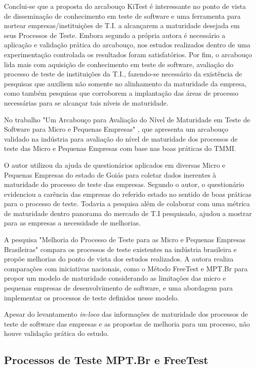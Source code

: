 Conclui-se que a proposta do arcabouço KiTest é interessante no ponto de vista de disseminação de conhecimento em teste de software e uma ferramenta para nortear empresas/instituições de T.I. a alcançarem a maturidade desejada em seus Processos de Teste. Embora segundo a própria autora é necessário a aplicação e validação prática do arcabouço, nos estudos realizados dentro de uma experimentação controlada os resultados foram satisfatórios. Por fim, o arcabouço lida mais com aquisição de conhecimento em teste de software, avaliação do processo de teste de instituições da T.I., fazendo-se necessário da existência de pesquisas que auxiliem não somente no alinhamento da maturidade da empresa, como também pesquisas que corroborem a implantação das áreas de processo necessárias para se alcançar tais níveis de maturidade.

No trabalho "Um Arcabouço para Avaliação do Nível de Maturidade em Teste de Software para Micro e Pequenas Empresas" \cite{Araujo2013}, que apresenta um arcabouço validado na indústria para avaliação do nível de maturidade dos processos de teste das Micro e Pequenas Empresas com base nas boas práticas do TMMI. 

O autor utilizou da ajuda de questionários aplicados em diversas Micro e Pequenas Empresas do estado de Goiás para coletar dados inerentes à maturidade do processo de teste das empresas. Segundo o autor, o questionário evidenciou a carência das empresas do referido estado no sentido de boas práticas para o processo de teste. Todavia a pesquisa além de colaborar com uma métrica de maturidade dentro panorama do mercado de T.I pesquisado, ajudou a mostrar para as empresas a necessidade de melhorias.

A pesquisa "Melhoria do Processo de Teste para as Micro e Pequenas Empresas Brasileiras" \cite{SilvaDias2015} compara os processos de teste existentes na indústria brasileira e propõe melhorias do ponto de vista dos estudos realizados. 
A autora realiza comparações com iniciativas nacionais, como o Método FreeTest e MPT.Br para propor um modelo de maturidade considerando as limitações das micro e pequenas empresas de desenvolvimento de software, e uma abordagem para implementar os processos de teste definidos nesse modelo.

Apesar do levantamento \textit{in-loco} das informações de maturidade dos processos de teste de software das empresas e as propostas de melhoria para um processo, não houve validação prática do estudo. 

\subsection{Processos de Teste MPT.Br e FreeTest}
\label{processosteste}

